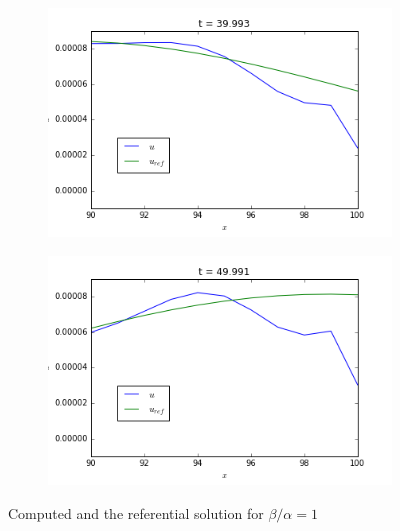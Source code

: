 \begin{figure}[h]
	\begin{subfigure}{.5\linewidth}
		\includegraphics[scale=.5]{figures/robin1A.png}	
	\end{subfigure}
	\begin{subfigure}{.5\linewidth}
		\includegraphics[scale=.5]{figures/robin1B.png}	
	\end{subfigure}
	\caption{Computed and the referential solution for  $\beta/\alpha = 1$ \label{fig:robin1}}
\end{figure}

